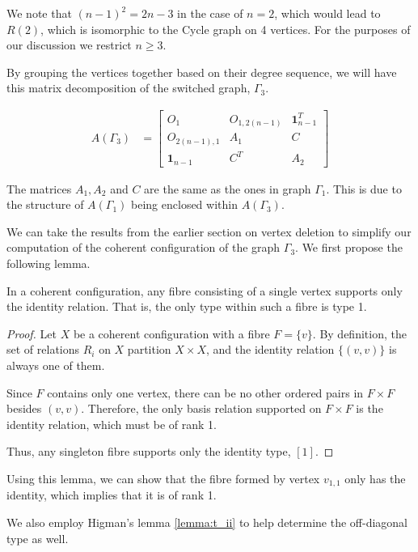 We note that $(n-1)^2=2n-3$ in the case of $n=2$, which would lead to $R(2)$, which is isomorphic to the Cycle graph on 4 vertices. For the purposes of our discussion we restrict $n\geq3$.

By grouping the vertices together based on their degree sequence, we will have this matrix decomposition of the switched graph, $\Gamma_3$.

\begin{align*}
    A(\Gamma_3) &= \begin{bmatrix}
        O_1 & O_{1,2(n-1)} & \mathbf{1}_{n-1}^T \\
        O_{2(n-1),1} & A_1 & C \\
        \mathbf{1}_{n-1} & C^T & A_2
    \end{bmatrix}
\end{align*}
\begin{remark}
    The matrices $A_1,A_2$ and $C$ are the same as the ones in graph $\Gamma_1$. This is due to the structure of $A(\Gamma_1)$ being enclosed within $A(\Gamma_3)$.
\end{remark}
We can take the results from the earlier section on vertex deletion to simplify our computation of the coherent configuration of the graph $\Gamma_3$. We first propose the following lemma.

\begin{lemma}
    In a coherent configuration, any fibre consisting of a single vertex supports only the identity relation. That is, the only type within such a fibre is type 1.
\end{lemma}
\begin{proof}
    Let \( X \) be a coherent configuration with a fibre \( F = \{v\} \). By definition, the set of relations \( R_i \) on \( X \) partition \( X \times X \), and the identity relation \( \{(v,v)\} \) is always one of them.

    Since \( F \) contains only one vertex, there can be no other ordered pairs in \( F \times F \) besides \( (v,v) \). Therefore, the only basis relation supported on \( F \times F \) is the identity relation, which must be of rank 1.

    Thus, any singleton fibre supports only the identity type, $[1]$.
\end{proof}

Using this lemma, we can show that the fibre formed by vertex $v_{1,1}$ only has the identity, which implies that it is of rank 1.

We also employ Higman's lemma \ref{lemma:t_ii} to help determine the off-diagonal type as well.

